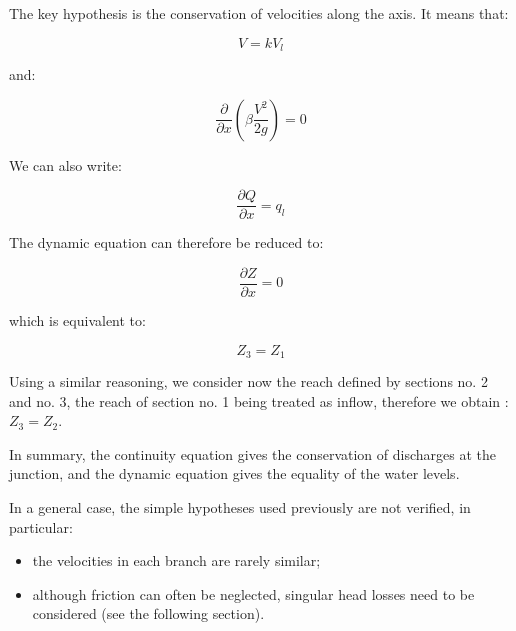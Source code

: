 \vspace{0.5cm}

The key hypothesis is the conservation of velocities along the axis. It means that:

\begin{equation}
  V = k V_l
\end{equation}

and:

\begin{equation}
  \frac{\partial}{\partial x} \left ( \beta \frac{V^2}{2g} \right ) = 0
\end{equation}

We can also write:

\begin{equation}
  \frac{\partial Q}{\partial x} = q_l
\end{equation}

\vspace{0.5cm}

The dynamic equation can therefore be reduced to:

\begin{equation}
  \frac{\partial Z}{\partial x} = 0
\end{equation}

which is equivalent to:

\begin{equation}
  Z_3 = Z_1
\end{equation}

\vspace{0.5cm}

Using a similar reasoning, we consider now the reach defined by sections no. 2 and no. 3, the reach of section no. 1 being treated as inflow, therefore we obtain : $Z_3 = Z_2$.

\vspace{0.5cm}

In summary, the continuity equation gives the conservation of discharges at the junction, and the dynamic equation gives the equality of the water levels.

\vspace{0.5cm}

In a general case, the simple hypotheses used previously are not verified, in particular:
\begin{itemize}
 \item the velocities in each branch are rarely similar;
 \item although friction can often be neglected, singular head losses need to be considered (see the following section).
\end{itemize}

